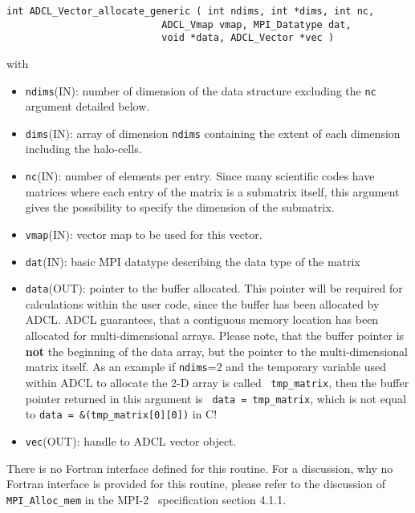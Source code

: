 \begin{verbatim}
int ADCL_Vector_allocate_generic ( int ndims, int *dims, int nc, 
                           ADCL_Vmap vmap, MPI_Datatype dat, 
                           void *data, ADCL_Vector *vec )

\end{verbatim}
with
\begin{itemize}
\item {\tt ndims}(IN): number of dimension of the data structure excluding the
  {\tt nc} argument detailed below.
\item {\tt dims}(IN): array of dimension {\tt ndims} containing the extent of
  each dimension including the halo-cells.
\item {\tt nc}(IN): number of elements per entry. Since many scientific codes
  have matrices where each entry of the matrix is a submatrix itself, this
  argument gives the possibility to specify the dimension of the submatrix.
\item {\tt vmap}(IN): vector map to be used for this vector.
\item {\tt dat}(IN): basic MPI datatype describing the data type of the matrix
\item {\tt data}(OUT): pointer to the buffer allocated. This pointer will be
  required for calculations within the user code, since the buffer has been
  allocated by ADCL. ADCL guarantees, that a contiguous memory location has
  been allocated for multi-dimensional arrays. Please note, that the buffer
  pointer is {\bf not} the beginning of the data array, but the pointer to the
  multi-dimensional matrix itself. As an example if {\tt ndims}=2 and the
  temporary variable used within ADCL to allocate the 2-D array is called {\tt
    tmp\_matrix}, then the buffer pointer returned in this argument is {\tt
    data = tmp\_matrix}, which is not equal to {\tt data =
    \&(tmp\_matrix[0][0])} in C!
\item {\tt vec}(OUT): handle to ADCL vector object.
\end{itemize}
There is no Fortran interface defined for this routine. For a discussion, why
no Fortran interface is provided for this routine, please refer to the
discussion of {\tt MPI\_Alloc\_mem} in the MPI-2~\cite{mpi2} specification
section 4.1.1.

